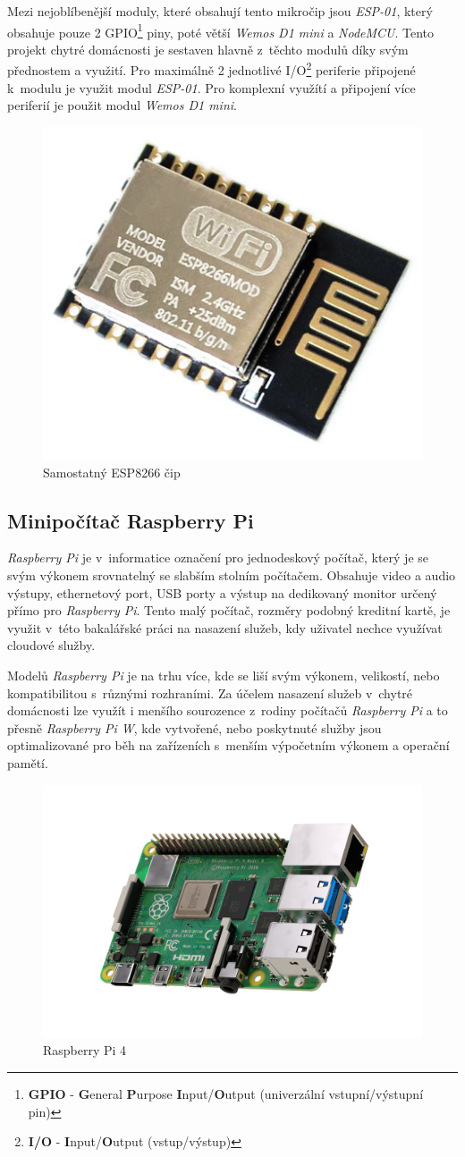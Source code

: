 Mezi nejoblíbenější moduly, které obsahují tento mikročip jsou \emph{ESP-01}, který obsahuje pouze 2 GPIO\footnote{\textbf{GPIO} - \textbf{G}eneral \textbf{P}urpose \textbf{I}nput/\textbf{O}utput (univerzální vstupní/výstupní pin)} piny, poté větší \emph{Wemos D1 mini} a \emph{NodeMCU}.
Tento projekt chytré domácnosti je sestaven hlavně z~těchto modulů díky svým přednostem a využití.
Pro maximálně 2 jednotlivé I/O\footnote{\textbf{I/O} - \textbf{I}nput/\textbf{O}utput (vstup/výstup)} periferie připojené k~modulu je využit modul \emph{ESP-01}.
Pro komplexní využítí a připojení více periferií je použit modul \emph{Wemos D1 mini}.

\begin{figure}[hbt]
  \centering
  \includegraphics[width=.2 \linewidth]{obrazky-figures/esp_standalone.png}
  \caption{Samostatný ESP8266 čip}
  \label{figure:esp8266}
\end{figure}

\subsection*{Minipočítač Raspberry Pi}
\label{terminy:raspberry}

\emph{Raspberry Pi} je v~informatice označení pro jednodeskový počítač, který je se svým výkonem srovnatelný se slabším stolním počítačem.
Obsahuje video a audio výstupy,
ethernetový port, USB porty a výstup na dedikovaný monitor určený přímo pro \emph{Raspberry Pi}.
Tento malý počítač, rozměry podobný kreditní kartě, je využit v~této bakalářské práci na nasazení služeb, kdy uživatel nechce využívat cloudové služby.

Modelů \emph{Raspberry Pi} je na trhu více, kde se liší svým výkonem, velikostí, nebo kompatibilitou s~různými rozhraními.
Za účelem nasazení služeb v~chytré domácnosti lze využít i menšího sourozence z~rodiny počítačů \emph{Raspberry Pi} a to přesně \emph{Raspberry Pi W},
kde vytvořené, nebo poskytnuté služby jsou optimalizované pro běh na zařízeních s~menším výpočetním výkonem a operační pamětí.

\begin{figure}[ht]
  \centering
  \includegraphics[width=.5 \linewidth]{obrazky-figures/raspberry.png}
  \caption{Raspberry Pi 4}
\end{figure}

